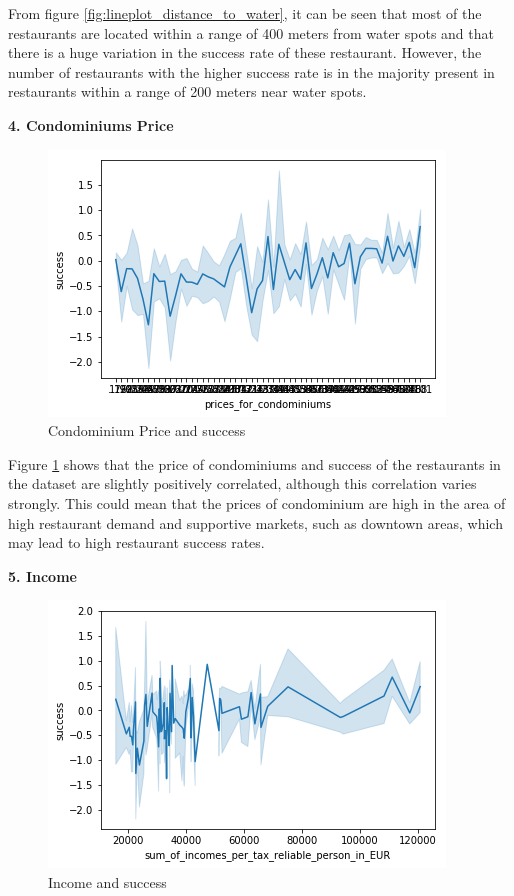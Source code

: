 \documentclass[a4paper, 11pt, oneside]{Thesis}  %
\begin{document}
From figure \ref{fig:lineplot_distance_to_water}, it can be seen that most of the restaurants are located within a range of 400 meters from water spots and that there is a huge variation in the success rate of these restaurant. However, the number of restaurants with the higher success rate is in the majority present in restaurants within a range of 200 meters near water spots.

\textbf{4.	Condominiums Price}
 
\begin{figure}[h]
\includegraphics[scale=0.7]{Figures/Exploratory/lineplot_prices_for_condominiums.png}
\centering
\caption{Condominium Price and success}
\label{fig:lineplot_prices_for_condominiums}
\end{figure}
 
Figure \ref{fig:lineplot_prices_for_condominiums} shows that the price of condominiums and success of the restaurants in the dataset are slightly positively correlated, although this correlation varies strongly. This could mean that the prices of condominium are high in the area of high restaurant demand and supportive markets, such as downtown areas, which may lead to high restaurant success rates.

\textbf{5.	Income}
 
\begin{figure}[h]
\includegraphics[scale=0.7]{Figures/Exploratory/lineplot_income.png}
\centering
\caption{Income and success}
\label{fig:lineplot_income}
\end{figure}
\end{document}

